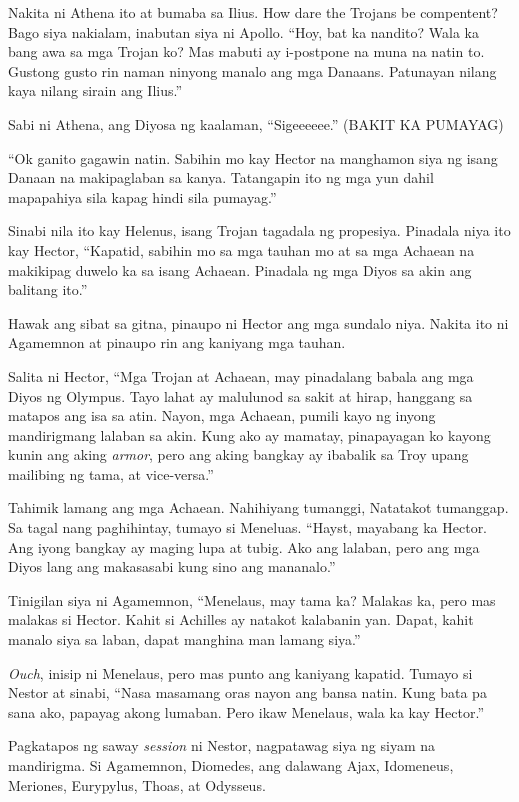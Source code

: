 \documentclass[12pt,letterpaper]{report}
\begin{document}
Nakita ni Athena ito at bumaba sa Ilius. How dare the Trojans be compentent? Bago siya nakialam, inabutan siya ni Apollo. ``Hoy, bat ka nandito? Wala ka bang awa sa mga Trojan ko? Mas mabuti ay i-postpone na muna na natin to. Gustong gusto rin naman ninyong manalo ang mga Danaans. Patunayan nilang kaya nilang sirain ang Ilius.''

Sabi ni Athena, ang Diyosa ng kaalaman, ``Sigeeeeee.'' (BAKIT KA PUMAYAG)

``Ok ganito gagawin natin. Sabihin mo kay Hector na manghamon siya ng isang Danaan na makipaglaban sa kanya. Tatangapin ito ng mga yun dahil mapapahiya sila kapag hindi sila pumayag.''

Sinabi nila ito kay Helenus, isang Trojan tagadala ng propesiya. Pinadala niya ito kay Hector, ``Kapatid, sabihin mo sa mga tauhan mo at sa mga Achaean na makikipag duwelo ka sa isang Achaean. Pinadala ng mga Diyos sa akin ang balitang ito.''

Hawak ang sibat sa gitna, pinaupo ni Hector ang mga sundalo niya. Nakita ito ni Agamemnon at pinaupo rin ang kaniyang mga tauhan.

Salita ni Hector, ``Mga Trojan at Achaean, may pinadalang babala ang mga Diyos ng Olympus. Tayo lahat ay malulunod sa sakit at hirap, hanggang sa matapos ang isa sa atin. Nayon, mga Achaean, pumili kayo ng inyong mandirigmang lalaban sa akin. Kung ako ay mamatay, pinapayagan ko kayong kunin ang aking \textit{armor}, pero ang aking bangkay ay ibabalik sa Troy upang mailibing ng tama, at vice-versa.''

Tahimik lamang ang mga Achaean. Nahihiyang tumanggi, Natatakot tumanggap. Sa tagal nang paghihintay, tumayo si Meneluas. ``Hayst, mayabang ka Hector. Ang iyong bangkay ay maging lupa at tubig. Ako ang lalaban, pero ang mga Diyos lang ang makasasabi kung sino ang mananalo.''

Tinigilan siya ni Agamemnon, ``Menelaus, may tama ka? Malakas ka, pero mas malakas si Hector. Kahit si Achilles ay natakot kalabanin yan. Dapat, kahit manalo siya sa laban, dapat manghina man lamang siya.''

\textit{Ouch}, inisip ni Menelaus, pero mas punto ang kaniyang kapatid. Tumayo si Nestor at sinabi, ``Nasa masamang oras nayon ang bansa natin. Kung bata pa sana ako, papayag akong lumaban. Pero ikaw Menelaus, wala ka kay Hector.''

Pagkatapos ng saway \textit{session} ni Nestor, nagpatawag siya ng siyam na mandirigma. Si Agamemnon, Diomedes, ang dalawang Ajax, Idomeneus, Meriones, Eurypylus, Thoas, at Odysseus.
\end{document}
